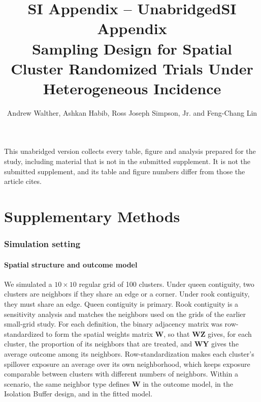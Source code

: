 \documentclass[11pt]{article}
\title{\iffullsi SI Appendix -- Unabridged\else SI Appendix\fi\\[0.6em]\large Sampling Design for Spatial Cluster Randomized Trials Under Heterogeneous Incidence}
\author{Andrew Walther, Ashkan Habib, Ross Joseph Simpson, Jr. and Feng-Chang Lin}
\date{}
\begin{document}
\maketitle
\iffullsi\noindent This unabridged version collects every table, figure and analysis prepared for the study, including material that is not in the submitted supplement. It is not the submitted supplement, and its table and figure numbers differ from those the article cites.\par\fi
\tableofcontents
\clearpage
{}
\listoffigures
\clearpage
{}
\listoftables
\clearpage

\part{Supplementary Methods}

\FloatBarrier
\section{Simulation setting}\label{detailed-simulation-methods}



\subsection{Spatial structure and outcome model}\label{spatial-structure-and-outcome-model}


We simulated a \(10\times10\) regular grid of 100 clusters. Under queen
contiguity, two clusters are neighbors if they share an edge or a corner.
Under rook contiguity, they must share an edge. Queen contiguity is
primary. Rook contiguity is a sensitivity analysis and matches the
neighbors used on the grids of the earlier small-grid study. For
each definition, the binary adjacency matrix was row-standardized to
form the spatial weights matrix \(\mathbf{W}\), so that \(\mathbf{W}\mathbf{Z}\) gives, for each
cluster, the proportion of its neighbors that are treated, and \(\mathbf{W}\mathbf{Y}\)
gives the average outcome among its neighbors. Row-standardization makes each cluster's spillover exposure an average over its own neighborhood, which keeps exposure comparable between clusters with different numbers of neighbors. Within a scenario, the same neighbor
type defines \(\mathbf{W}\) in the outcome model, in the Isolation Buffer design,
and in the fitted model.
\end{document}
